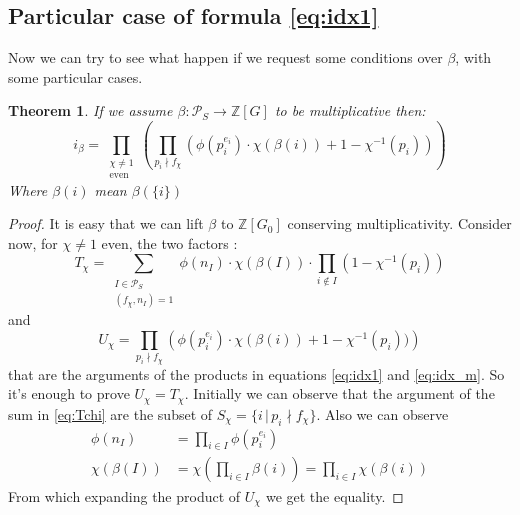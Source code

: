 \documentclass[]{article}
\theoremstyle{plain}
\newtheorem{teo}{Theorem}[section]
\theoremstyle{remark}
\theoremstyle{definition}
\newcommand{\PS}{\mathcal{P}_S}
\newcommand{\Z}{\mathbb{Z}}
\begin{document}
	\subsection{Particular case of formula \ref{eq:idx1}}

	Now we can try to see what happen if we request some conditions over $\beta$, with some particular cases.
	
	\begin{teo}
		\label{teo:idx_m}
		If we assume $ \beta : \PS \to \Z[G] $ to be multiplicative then:
		\begin{equation}\label{eq:idx_m}
			i_\beta =  \prod_{ \substack{\chi \neq 1 \\ \text{even}}} \left( \prod_{p_i \nmid f_\chi} \left( \phi (p_i^{e_i}) \cdot \chi (\beta (i))  + 1- \chi^{-1} (p_i)\right)  \right) 
		\end{equation}
		Where $ \beta(i) $ mean $ \beta (\{i\})$
	\end{teo}

	\begin{proof}
		It is easy that we can lift $ \beta $ to $ \Z [G_0] $ conserving multiplicativity. Consider now, for $ \chi \neq 1 $ even, the two factors :
		\begin{equation}\label{eq:Tchi}
			T_\chi = \sum_{\substack{ I \in \PS \\ (f_\chi , n_I) = 1}} \phi (n_I) \cdot \chi (\beta (I)) \cdot \prod_{i \not \in  I} (1- \chi^{-1} (p_i)) 
		\end{equation}
		and 
		\begin{equation}\label{eq:Uchi}
			U_\chi = \prod_{p_i \nmid f_\chi} \left( \phi (p_i^{e_i}) \cdot \chi (\beta (i))  + 1- \chi^{-1} (p_i))\right)
		\end{equation}
		that are the arguments of the products in equations \ref{eq:idx1} and \ref{eq:idx_m}. So it's enough to prove $ U_\chi = T_\chi $. 
		Initially we can observe that the argument of the sum in \ref{eq:Tchi} are the subset of $ S_\chi = \{ i \,|\, p_i \nmid f_\chi \} $. Also we can observe 
		 \begin{align*}
		 	\phi (n_I ) & = \prod_{ i \in I} \phi(p_i^{e_i})\\
		 	\chi( \beta (I)) & = \chi \left(  \prod_{ i \in I} \beta(i) \right)  = \prod_{ i \in I} \chi(\beta (i))
		 \end{align*}
		 From which expanding the product of $ U_\chi $ we get the equality.
	\end{proof}
\end{document}
